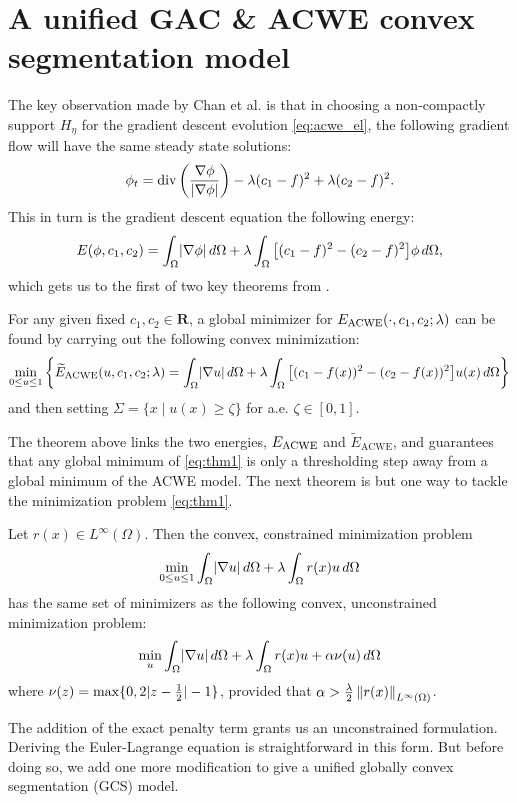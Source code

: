 \section{A unified GAC \& ACWE convex segmentation model}
The key observation made by Chan et al. \cite{chan2006algorithms} is that in choosing a non-compactly support $H_\eta$ for the gradient descent evolution \eqref{eq:acwe_el}, the following gradient flow will have the same steady state solutions: 
\begin{align*}
\phi_t = \operatorname{div}\left(\frac{\nabla \phi}{\lvert\nabla \phi\rvert} \right) 
- \lambda (c_1 - f)^2 + \lambda (c_2 - f)^2 .
\end{align*}
This in turn is the gradient descent equation the following energy:
\begin{align}
E(\phi, c_1, c_2) 
= \int_\Omega \lvert\nabla \phi\rvert \,d\Omega 
+ \lambda \int_\Omega \big[ (c_1 - f)^2 - (c_2 - f)^2 \big] \phi \,d\Omega ,
\label{eq:mod_acwe}
\end{align}
which gets us to the first of two key theorems from \cite{chan2006algorithms}.

\begin{thm}
	For any given fixed $c_1, c_2 \in \mathbf{R}$, a global minimizer for $E_\textrm{ACWE}(\cdot, c_1, c_2; \lambda)$ can be found by carrying out the following convex minimization: 
	\begin{align}
	\min_{0\leq u \leq 1}\left\{
		\widetilde E_{\textrm{ACWE}} (u, c_1, c_2; \lambda)
		=
		\int_{\Omega} \lvert\nabla u\rvert \,d\Omega 
	+ \lambda\int_{\Omega} \big[ (c_1 - f(x) )^2 - (c_2 - f(x))^2 \big] u(x) \,d\Omega
	\right\}
	\label{eq:thm1}
	\end{align}
	and then setting $\Sigma = \{ x \mid u(x) \geq \zeta \}$ for a.e. $\zeta \in [0, 1]$.
	\label{thm:1}
\end{thm}
The theorem above links the two energies, $E_\textrm{ACWE}$ and $\widetilde E_\textrm{ACWE}$,
and guarantees that any global minimum of \eqref{eq:thm1} is only a thresholding step away from a global minimum of the ACWE model. The next theorem is but one way to tackle the minimization problem \eqref{eq:thm1}.

\begin{thm}
	Let $r(x) \in L^\infty(\Omega)$. Then the convex, constrained minimization problem
	\begin{align*}
	\min_{0 \leq u \leq 1} \int_{\Omega} \lvert\nabla u\rvert \,d\Omega + \lambda \int_{\Omega} r(x) u \,d\Omega 
	\end{align*}
	has the same set of minimizers as the following convex, unconstrained minimization problem:
	\begin{align*}
	\min_u \int_{\Omega} \lvert\nabla u\rvert \,d\Omega + \lambda \int_{\Omega} r(x) u + \alpha \nu(u) \,d\Omega 
	\end{align*}
	where $\nu(z) = \max\{ 0 , 2\lvert z - \frac{1}{2} \rvert - 1\}$, provided that $\alpha > \frac{\lambda}{2}\left\lVert r(x)\right\rVert_{L^\infty(\Omega)}$.
	\label{thm:2}
\end{thm}
The addition of the exact penalty term \cite{hiriart1993convexI,hiriart1993convexII} grants us an unconstrained formulation. Deriving the Euler-Lagrange equation is straightforward in this form. But before doing so, we add one more modification to give a unified globally convex segmentation (GCS) model.

